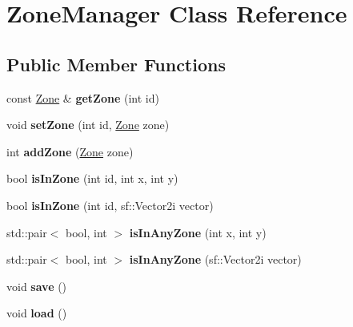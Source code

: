 \hypertarget{classZoneManager}{\section{Zone\-Manager Class Reference}
\label{classZoneManager}
}
\subsection*{Public Member Functions}
\begin{DoxyCompactItemize}
\item 
\hypertarget{classZoneManager_ac543f20549084fb9ba57f7e949822fe8}{const \hyperlink{structZone}{Zone} \& {\bfseries get\-Zone} (int id)}\label{classZoneManager_ac543f20549084fb9ba57f7e949822fe8}

\item 
\hypertarget{classZoneManager_a4df31da6854b67e51fd7ec54186ebba0}{void {\bfseries set\-Zone} (int id, \hyperlink{structZone}{Zone} zone)}\label{classZoneManager_a4df31da6854b67e51fd7ec54186ebba0}

\item 
\hypertarget{classZoneManager_aed2219b748110c4b13d7673687340cc8}{int {\bfseries add\-Zone} (\hyperlink{structZone}{Zone} zone)}\label{classZoneManager_aed2219b748110c4b13d7673687340cc8}

\item 
\hypertarget{classZoneManager_a1a3746c0ebc7d065d54bab8d884503b4}{bool {\bfseries is\-In\-Zone} (int id, int x, int y)}\label{classZoneManager_a1a3746c0ebc7d065d54bab8d884503b4}

\item 
\hypertarget{classZoneManager_a0b9ab84b3162ba1c87a4afe84bb40b6f}{bool {\bfseries is\-In\-Zone} (int id, sf\-::\-Vector2i vector)}\label{classZoneManager_a0b9ab84b3162ba1c87a4afe84bb40b6f}

\item 
\hypertarget{classZoneManager_a1627d595ec442fcb82d4ea770006327c}{std\-::pair$<$ bool, int $>$ {\bfseries is\-In\-Any\-Zone} (int x, int y)}\label{classZoneManager_a1627d595ec442fcb82d4ea770006327c}

\item 
\hypertarget{classZoneManager_af99f3a88afa59f3df6fb3a83adf54844}{std\-::pair$<$ bool, int $>$ {\bfseries is\-In\-Any\-Zone} (sf\-::\-Vector2i vector)}\label{classZoneManager_af99f3a88afa59f3df6fb3a83adf54844}

\item 
\hypertarget{classZoneManager_a03e6c9f49bf83b0b8ce663d49e5f398b}{void {\bfseries save} ()}\label{classZoneManager_a03e6c9f49bf83b0b8ce663d49e5f398b}

\item 
\hypertarget{classZoneManager_aa9587473c290133ef47a835d362de011}{void {\bfseries load} ()}\label{classZoneManager_aa9587473c290133ef47a835d362de011}

\end{DoxyCompactItemize}


